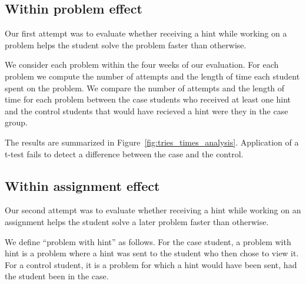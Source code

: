 \documentclass{sigchi/sigchi}
\begin{document}
\subsection{Within problem effect}

Our first attempt was to evaluate whether receiving a hint while
working on a problem helps the student solve the problem faster than
otherwise.

We consider each problem within the four weeks of our evaluation. For
each problem we compute the number of attempts and the length of time
each student spent on the problem. We compare the number of attempts
and the length of time for each problem between the case students who
received at least one hint and the control students
that would have recieved a hint were they in the case group.

The results are summarized in
Figure~\ref{fig:tries_times_analysis}. Application of a t-test fails
to detect a difference between the case and the control.

\subsection{Within assignment effect}

Our second attempt was to evaluate whether receiving a hint while
working on an assignment helps the student solve a later problem faster
than otherwise.

We define ``problem with hint'' as follows. For the case student, a
problem with hint is a problem where a hint was sent to the student
who then chose to view it. For a control student, it is a problem for
which a hint would have been sent, had the student been in the case.
\end{document}
